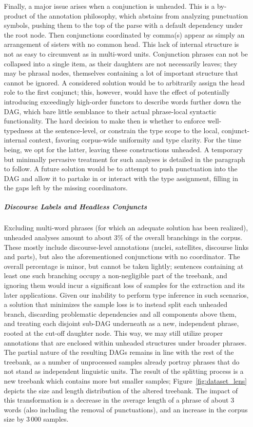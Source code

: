 Finally, a major issue arises when a conjunction is unheaded.
This is a by-product of the annotation philosophy, which abstains from analyzing punctuation symbols, pushing them to the top of the parse with a default dependency under the root node.
Then conjunctions coordinated by comma(s) appear as simply an arrangement of sisters with no common head.
This lack of internal structure is not as easy to circumvent as in multi-word units.
Conjunction phrases can not be collapsed into a single item, as their daughters are not  necessarily leaves; they may be phrasal nodes, themselves containing a lot of important structure that cannot be ignored.
A considered solution would be to arbitrarily assign the head role to the first conjunct; this, however, would have the effect of potentially introducing exceedingly high-order functors to describe words further down the DAG, which bare little semblance to their actual phrase-local syntactic functionality.
The hard decision to make then is whether to enforce well-typedness at the sentence-level, or constrain the type scope to the local, conjunct-internal context, favoring corpus-wide uniformity and type clarity.
For the time being, we opt for the latter, leaving these constructions unheaded.
A temporary but minimally pervasive treatment for such analyses is detailed in the paragraph to follow. 
A future solution would be to attempt to push punctuation into the DAG and allow it to partake in or interact with the type assignment, filling in the gaps left by the missing coordinators.

\subparagraph{Discourse Labels and Headless Conjuncts}
Excluding multi-word phrases (for which an adequate solution has been realized), unheaded analyses amount to about 3\% of the overall branchings in the corpus.
These mostly include discourse-level annotations (nuclei, satellites, discourse links and parts), but also the aforementioned conjunctions with no coordinator.
The overall percentage is minor, but cannot be taken lightly; sentences containing at least one such branching occupy a non-negligible part of the treebank, and ignoring them would incur a significant loss of samples for the extraction and its later applications.
Given our inability to perform type inference in such scenarios, a solution that minimizes the sample loss is to instead split each unheaded branch, discarding problematic dependencies and all components above them, and treating each disjoint sub-DAG underneath as a new, independent phrase, rooted at the cut-off daughter node.
This way, we may still utilize proper annotations that are enclosed within unheaded structures under broader phrases.
The partial nature of the resulting DAGs remains in line with the rest of the treebank, as a number of unprocessed samples already portray phrases that do not stand as independent linguistic units.
The result of the splitting process is a new treebank which contains more but smaller samples; Figure~\ref{fig:dataset_lens} depicts the size and length distribution of the altered treebank.
The impact of this transformation is a decrease in the average length of a phrase of about 3 words (also including the removal of punctuations), and an increase in the corpus size by 3\,000 samples.

